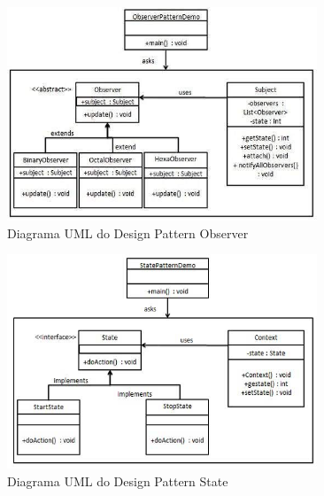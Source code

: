 \begin{figure}[H]
	\centering
	\includegraphics[width = 350px]{figuras/observer_pattern_uml_diagram}
	\caption {Diagrama UML do Design Pattern Observer}
	\label{fig:dp_observer}
\end{figure}
\begin{figure}[H]
	\centering
	\includegraphics[width = 350px]{figuras/state_pattern_uml_diagram}
	\caption {Diagrama UML do Design Pattern State}
	\label{fig:dp_state}
\end{figure}


